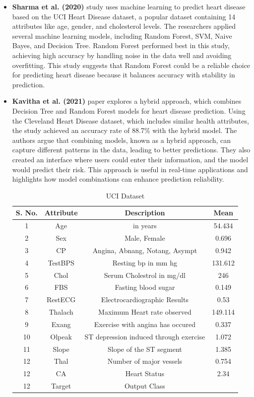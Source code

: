 \documentclass[12pt]{article}
\begin{document}
\begin{itemize}
\setlength{\itemsep}{0pt}  %
  \setlength{\parskip}{0pt}
\item \textbf{Sharma et al. (2020)} study uses machine learning to predict heart disease based on the UCI Heart Disease dataset, a popular dataset containing 14 attributes like age, gender, and cholesterol levels. The researchers applied several machine learning models, including Random Forest, SVM, Naive Bayes, and Decision Tree. Random Forest performed best in this study, achieving high accuracy by handling noise in the data well and avoiding overfitting. This study suggests that Random Forest could be a reliable choice for predicting heart disease because it balances accuracy with stability in prediction.


\item \textbf{Kavitha et al. (2021)} paper explores a hybrid approach, which combines Decision Tree and Random Forest models for heart disease prediction. Using the Cleveland Heart Disease dataset, which includes similar health attributes, the study achieved an accuracy rate of 88.7\% with the hybrid model. The authors argue that combining models, known as a hybrid approach, can capture different patterns in the data, leading to better predictions. They also created an interface where users could enter their information, and the model would predict their risk. This approach is useful in real-time applications and highlights how model combinations can enhance prediction reliability.




\begin{table}[H]
\caption{UCI Dataset  \label{tab:tabone}}
\begin{center}
\small
\begin{tabular}{cccc}
S. No. & Attribute & Description & Mean \\\hline
1 & Age & in years & 54.434 \\
2 & Sex & Male, Female & 0.696 \\
3 & CP & Angina, Abnang, Notang, Asympt & 0.942 \\
4 & TestBPS & Resting bp in mm hg &  131.612\\
5 & Chol  & Serum Cholestrol in mg/dl & 246 \\
6 & FBS & Fasting blood sugar &  0.149\\
7 & RestECG & Electrocardiographic Results &  0.53\\
8 & Thalach & Maximum Heart rate observed &  149.114\\
9 & Exang & Exercise with angina has occured &  0.337\\
10 & Olpeak & ST depression induced through exercise & 1.072 \\
11 & Slope & Slope of the ST segment &  1.385\\
12 & Thal & Number of major vessels &  0.754\\
12 & CA & Heart Status &  2.34\\
12 & Target & Output Class &  \\


\end{tabular}
\end{center}
\end{table}
\end{itemize}
\end{document}
